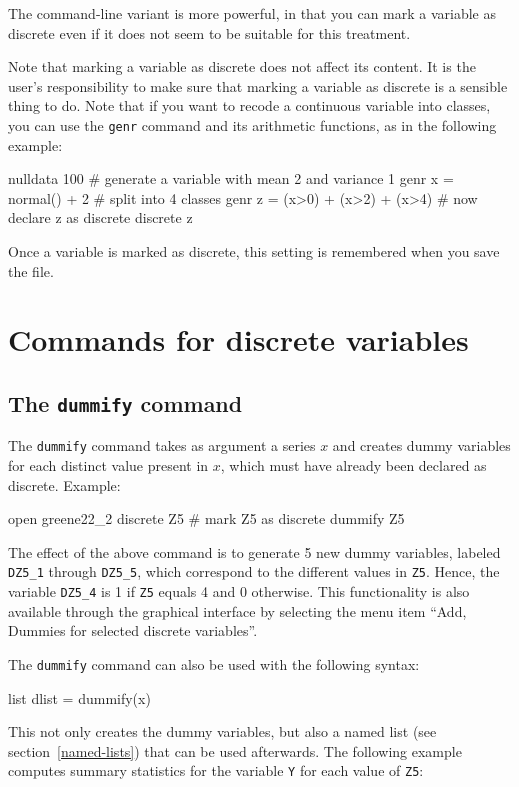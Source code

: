 The command-line variant is more powerful, in that you can mark a
variable as discrete even if it does not seem to be suitable for
this treatment.

Note that marking a variable as discrete does not affect its content.
It is the user's responsibility to make sure that marking a variable
as discrete is a sensible thing to do.  Note that if you want to
recode a continuous variable into classes, you can use the
\texttt{genr} command and its arithmetic functions, as in the
following example:
\begin{code}
nulldata 100
# generate a variable with mean 2 and variance 1
genr x = normal() + 2
# split into 4 classes
genr z = (x>0) + (x>2) + (x>4)
# now declare z as discrete
discrete z
\end{code}

Once a variable is marked as discrete, this setting is remembered when
you save the file.

\section{Commands for discrete variables}
\label{discr-commands}

\subsection{The \texttt{dummify} command}
\label{discr-dummify}

The \texttt{dummify} command takes as argument a series $x$ and creates
dummy variables for each distinct value present in $x$, which must
have already been declared as discrete.  Example:
\begin{code}
open greene22_2
discrete Z5 # mark Z5 as discrete
dummify Z5
\end{code}

The effect of the above command is to generate 5 new dummy variables,
labeled \texttt{DZ5\_1} through \texttt{DZ5\_5}, which correspond to
the different values in \texttt{Z5}. Hence, the variable
\texttt{DZ5\_4} is 1 if \texttt{Z5} equals 4 and 0 otherwise. This
functionality is also available through the graphical interface by
selecting the menu item ``Add, Dummies for selected discrete variables''.

The \texttt{dummify} command can also be used with the following
syntax:
\begin{code}
list dlist = dummify(x)
\end{code}
This not only creates the dummy variables, but also a named list (see
section~\ref{named-lists}) that can be used afterwards. The
following example computes summary statistics for the variable \texttt{Y} for
each value of \texttt{Z5}:

